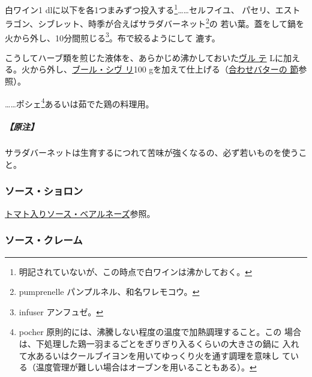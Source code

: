 \begin{recette}

白ワイン1\undemi{} dlに以下を各1つまみずつ投入する\footnote{明記されていないが、この時点で白ワインは沸かしておく。}\ldots{}\ldots{}セルフイユ、
パセリ、エストラゴン、シブレット、時季が合えばサラダバーネット\footnote{pumprenelle
  パンプルネル、和名ワレモコウ。}の
若い葉。蓋をして鍋を火から外し、10分間煎じる\footnote{infuser
  アンフュゼ。}。布で絞るようにして 漉す。

こうしてハーブ類を煎じた液体を、あらかじめ沸かしておいた\protect\hyperlink{veloute}{ヴル
テ}\troisquarts{}
Lに加える。火から外し、\protect\hyperlink{beurre-chivry}{ブール・シヴ
リ}100
gを加えて仕上げる（\protect\hyperlink{beurres-composes}{合わせバターの
節}参照）。

\ldots{}\ldots{}ポシェ\footnote{pocher
  原則的には、沸騰しない程度の温度で加熱調理すること。この
  場合は、下処理した鶏一羽まるごとをぎりぎり入るくらいの大きさの鍋に
  入れて水あるいはクールブイヨンを用いてゆっくり火を通す調理を意味し
  ている（温度管理が難しい場合はオーブンを用いることもある）。}あるいは茹でた鶏の料理用。

\hypertarget{nota-sauce-chivry}{%
\subparagraph{【原注】}\label{nota-sauce-chivry}}

サラダバーネットは生育するにつれて苦味が強くなるの、必ず若いものを使うこと。

\maeaki

\hypertarget{sauce-choron}{%
\subsubsection{ソース・ショロン}\label{sauce-choron}}


\protect\hyperlink{sauce-bearnaise-tomatee}{トマト入りソース・ベアルネーズ}参照。

\maeaki

\hypertarget{sauce-creme}{%
\subsubsection{ソース・クレーム}\label{sauce-creme}}



\end{recette}
